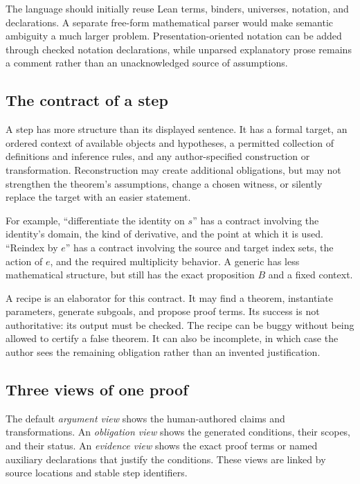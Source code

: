 \documentclass[11pt,letterpaper]{article}
\newcommand{\code}[1]{\texttt{\detokenize{#1}}}
\theoremstyle{remark}
\begin{document}
The language should initially reuse Lean terms, binders, universes, notation, and declarations. A separate free-form mathematical parser would make semantic ambiguity a much larger problem. Presentation-oriented notation can be added through checked notation declarations, while unparsed explanatory prose remains a comment rather than an unacknowledged source of assumptions.

\subsection{The contract of a step}

A step has more structure than its displayed sentence. It has a formal target, an ordered context of available objects and hypotheses, a permitted collection of definitions and inference rules, and any author-specified construction or transformation. Reconstruction may create additional obligations, but may not strengthen the theorem's assumptions, change a chosen witness, or silently replace the target with an easier statement.

For example, ``differentiate the identity on $s$'' has a contract involving the identity's domain, the kind of derivative, and the point at which it is used. ``Reindex by $e$'' has a contract involving the source and target index sets, the action of $e$, and the required multiplicity behavior. A generic \code{have B by search} has less mathematical structure, but still has the exact proposition $B$ and a fixed context.

A recipe is an elaborator for this contract. It may find a theorem, instantiate parameters, generate subgoals, and propose proof terms. Its success is not authoritative: its output must be checked. The recipe can be buggy without being allowed to certify a false theorem. It can also be incomplete, in which case the author sees the remaining obligation rather than an invented justification.

\subsection{Three views of one proof}

The default \emph{argument view} shows the human-authored claims and transformations. An \emph{obligation view} shows the generated conditions, their scopes, and their status. An \emph{evidence view} shows the exact proof terms or named auxiliary declarations that justify the conditions. These views are linked by source locations and stable step identifiers.
\end{document}
